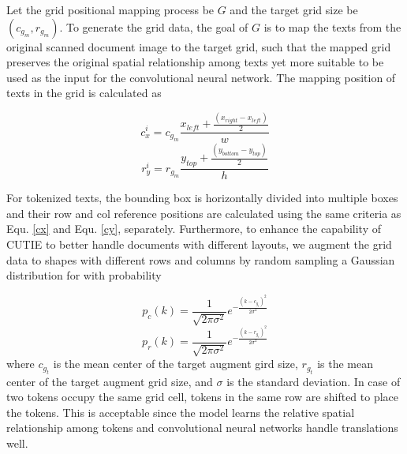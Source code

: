 \documentclass[10pt,twocolumn,letterpaper]{article}
\begin{document}
Let the grid positional mapping process be $G$ and the target grid size be $(c_{g_m}, r_{g_m})$. To generate the grid data, the goal of $G$ is to map the texts from the original scanned document image to the target grid, such that the mapped grid preserves the original spatial relationship among texts yet more suitable to be used as the input for the convolutional neural network. The mapping position of texts in the grid is calculated as

\begin{equation}
\label{cx}
c^i_x = c_{g_m} \frac{x_{left} + \frac{(x_{right} - x_{left})}{2}}{w}
\end{equation}
\begin{equation}
\label{cy}
r^i_y = r_{g_m} \frac{y_{top} + \frac{(y_{bottom} - y_{top})}{2}}{h}
\end{equation}

For tokenized texts, the bounding box is horizontally divided into multiple boxes and their row and col reference positions are calculated using the same criteria as Equ. \ref{cx} and Equ. \ref{cy}, separately. Furthermore, to enhance the capability of CUTIE to better handle documents with different layouts, we augment the grid data to shapes with different rows and columns by random sampling a Gaussian distribution for with probability

\begin{equation}
\label{augmentc}
p_c(k) = \frac{1}{\sqrt{2 \pi \sigma^2}} e^{- \frac{(k - c_{g_t})^2}{2 \sigma^2}}
\end{equation}
\begin{equation}
\label{augmentr}
p_r(k) = \frac{1}{\sqrt{2 \pi \sigma^2}} e^{- \frac{(k - r_{g_t})^2}{2 \sigma^2}}
\end{equation}
where $c_{g_t}$ is the mean center of the target augment gird size, $r_{g_t}$ is the mean center of the target augment grid size, and $\sigma$ is the standard deviation. In case of two tokens occupy the same grid cell, tokens in the same row are shifted to place the tokens. This is acceptable since the model learns the relative spatial relationship among tokens and convolutional neural networks handle translations well.
\end{document}
